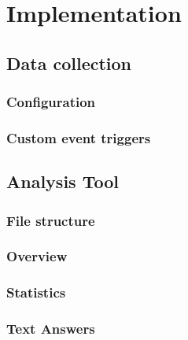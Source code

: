 
\chapter{Implementation}\label{chapter:implementation}

\section{Data collection}\label{section:dataCollectionIntegration}

\subsection{Configuration}\label{subsec:configuration}

\subsection{Custom event triggers} \label{subsec:triggers}

\section{Analysis Tool}\label{section:analysisTool}

\subsection{File structure}\label{subsec:fileStructure}

\subsection{Overview}\label{subsec:overview}

\subsection{Statistics}

\subsection{Text Answers}
